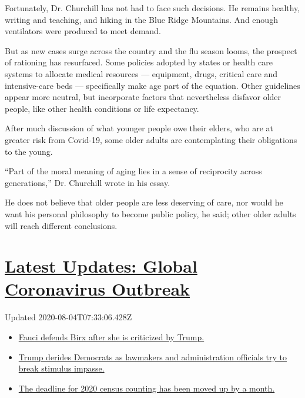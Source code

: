 Fortunately, Dr. Churchill has not had to face such decisions. He
remains healthy, writing and teaching, and hiking in the Blue Ridge
Mountains. And enough ventilators were produced to meet demand.

But as new cases surge across the country and the flu season looms, the
prospect of rationing has resurfaced. Some policies adopted by states or
health care systems to allocate medical resources --- equipment, drugs,
critical care and intensive-care beds --- specifically make age part of
the equation. Other guidelines appear more neutral, but incorporate
factors that nevertheless disfavor older people, like other health
conditions or life expectancy.

After much discussion of what younger people owe their elders, who are
at greater risk from Covid-19, some older adults are contemplating their
obligations to the young.

``Part of the moral meaning of aging lies in a sense of reciprocity
across generations,'' Dr. Churchill wrote in his essay.

He does not believe that older people are less deserving of care, nor
would he want his personal philosophy to become public policy, he said;
other older adults will reach different conclusions.

\hypertarget{latest-updates-global-coronavirus-outbreak}{%
\section{\texorpdfstring{\href{https://www.nytimes.com/2020/08/03/world/coronavirus-covid-19.html?action=click\&pgtype=Article\&state=default\&region=MAIN_CONTENT_1\&context=storylines_live_updates}{Latest
Updates: Global Coronavirus
Outbreak}}{Latest Updates: Global Coronavirus Outbreak}}\label{latest-updates-global-coronavirus-outbreak}}

Updated 2020-08-04T07:33:06.428Z

\begin{itemize}
\tightlist
\item
  \href{https://www.nytimes.com/2020/08/03/world/coronavirus-covid-19.html?action=click\&pgtype=Article\&state=default\&region=MAIN_CONTENT_1\&context=storylines_live_updates\#link-4547638f}{Fauci
  defends Birx after she is criticized by Trump.}
\item
  \href{https://www.nytimes.com/2020/08/03/world/coronavirus-covid-19.html?action=click\&pgtype=Article\&state=default\&region=MAIN_CONTENT_1\&context=storylines_live_updates\#link-15e7f995}{Trump
  derides Democrats as lawmakers and administration officials try to
  break stimulus impasse.}
\item
  \href{https://www.nytimes.com/2020/08/03/world/coronavirus-covid-19.html?action=click\&pgtype=Article\&state=default\&region=MAIN_CONTENT_1\&context=storylines_live_updates\#link-e5a2cda}{The
  deadline for 2020 census counting has been moved up by a month.}
\end{itemize}

